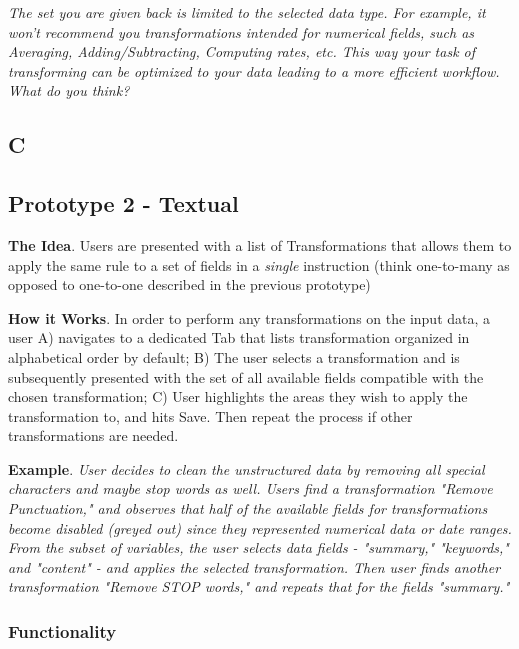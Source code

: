 \documentclass[12pt,letterpaper]{article}
\begin{document}
\textit{The set you are given back is limited to the selected data type. For example, it won't recommend you transformations intended for numerical fields, such as Averaging, Adding/Subtracting, Computing rates, etc. This way your task of transforming can be optimized to your data leading to a more efficient workflow. What do you think?}

\subsection*{C}

\subsection*{Prototype 2 - Textual}

\textbf{The Idea}.
Users are presented with a list of Transformations that allows them to apply the same rule to a set of fields in a \textit{single} instruction (think one-to-many as opposed to one-to-one described in the previous prototype)

\textbf{How it Works}. In order to perform any transformations on the input data, a user A) navigates to a dedicated Tab that lists transformation organized in alphabetical order by default; B) The user selects a transformation and is subsequently presented with the set of all available fields compatible with the chosen transformation; C) User highlights the areas they wish to apply the transformation to, and hits Save. Then repeat the process if other transformations are needed.

\textbf{Example}. \textit{User decides to clean the unstructured data by removing all special characters and maybe stop words as well. Users find a transformation "Remove Punctuation," and observes that half of the available fields for transformations become disabled (greyed out) since they represented numerical data or date ranges. From the subset of variables, the user selects data fields - "summary," "keywords," and "content" - and applies the selected transformation. Then user finds another transformation "Remove STOP words," and repeats that for the fields "summary."}

\subsubsection*{Functionality}
\end{document}
